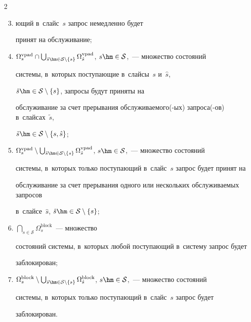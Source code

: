 \begin{multicols}{2}
\begin{enumerate}[(1)]
\setcounter{enumi}{2}


\item[\,] ющий в~слайс~$s$ запрос немедленно будет 


принят на обслуживание;


\item $\Omega_s^{\mathrm{vpad}} \cap 


\bigcup\nolimits_{\hat{s}\hm\in\mathcal{S}\setminus\{s\}} 


\Omega_{\hat{s}}^{\mathrm{vpad}}$, $s\hm\in\mathcal{S}$,~--- множество состояний 


системы, в~которых поступающие в~слайсы~$s$ и~$\hat{s}$,


$\hat{s}\hm\in\mathcal{S}\setminus\{s\}$, запросы будут приняты на 


обслуживание за счет прерывания об\-слу\-жи\-ва\-емо\-го(-ых) за\-про\-са(-ов) в~слайсах~$\tilde{s}$,


$\tilde{s}\hm\in\mathcal{S}\setminus\{s,\hat{s}\}$;


\item $\Omega_s^{\mathrm{vpad}} \setminus 


\bigcup\nolimits_{\hat{s}\hm\in\mathcal{S}\setminus\{s\}} 


\Omega_{\hat{s}}^{\mathrm{vpad}}$, $s\hm\in\mathcal{S}$,~--- множество состояний 


системы, в~которых только поступающий в~слайс~$s$ запрос будет принят на 


обслуживание за счет прерывания одного или нескольких об\-слу\-жи\-ва\-емых запросов 


в~слайсе~$\hat{s}$, $\hat{s}\hm\in\mathcal{S}\setminus\{s\}$;


\item $\bigcap\nolimits_{s\in\mathcal{S}}\Omega_s^{\mathrm{block}}$~--- множество 


состояний системы, в~которых любой поступающий в~систему запрос будет 


заблокирован;


\item $\Omega_s^{\mathrm{block}}\setminus 


\bigcup\nolimits_{\hat{s}\hm\in\mathcal{S}\setminus\{s\}} 


\Omega_{\hat{s}}^{\mathrm{block}}$, $s\hm\in\mathcal{S}$,~--- множество состояний 


системы, в~которых только поступающий в~слайс~$s$ запрос будет 


заблокирован.



\end{enumerate}
\end{multicols}
